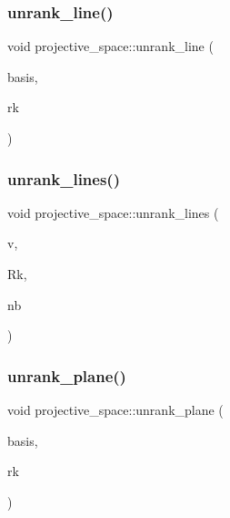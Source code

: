 \mbox{\label{classprojective__space_abdc61b40bc8adc18628e1d3a1755dcae}} 
\subsubsection{\texorpdfstring{unrank\+\_\+line()}{unrank\_line()}}
{\footnotesize\ttfamily void projective\+\_\+space\+::unrank\+\_\+line (\begin{DoxyParamCaption}\item[{\mbox{\hyperlink{galois_8h_a09fddde158a3a20bd2dcadb609de11dc}{I\+NT}} $\ast$}]{basis,  }\item[{\mbox{\hyperlink{galois_8h_a09fddde158a3a20bd2dcadb609de11dc}{I\+NT}}}]{rk }\end{DoxyParamCaption})}

\mbox{\label{classprojective__space_a9c508a38a1aa17b5b4c9dc7dbbc97be9}} 
\subsubsection{\texorpdfstring{unrank\+\_\+lines()}{unrank\_lines()}}
{\footnotesize\ttfamily void projective\+\_\+space\+::unrank\+\_\+lines (\begin{DoxyParamCaption}\item[{\mbox{\hyperlink{galois_8h_a09fddde158a3a20bd2dcadb609de11dc}{I\+NT}} $\ast$}]{v,  }\item[{\mbox{\hyperlink{galois_8h_a09fddde158a3a20bd2dcadb609de11dc}{I\+NT}} $\ast$}]{Rk,  }\item[{\mbox{\hyperlink{galois_8h_a09fddde158a3a20bd2dcadb609de11dc}{I\+NT}}}]{nb }\end{DoxyParamCaption})}

\mbox{\label{classprojective__space_ad88f7ed5193abc598e2436b4bca8c7e3}} 
\subsubsection{\texorpdfstring{unrank\+\_\+plane()}{unrank\_plane()}}
{\footnotesize\ttfamily void projective\+\_\+space\+::unrank\+\_\+plane (\begin{DoxyParamCaption}\item[{\mbox{\hyperlink{galois_8h_a09fddde158a3a20bd2dcadb609de11dc}{I\+NT}} $\ast$}]{basis,  }\item[{\mbox{\hyperlink{galois_8h_a09fddde158a3a20bd2dcadb609de11dc}{I\+NT}}}]{rk }\end{DoxyParamCaption})}

